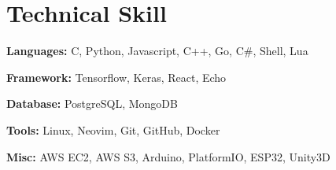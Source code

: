 \section{Technical Skill}
    \begin{onecolentry}
        \textbf{Languages:} C, Python, Javascript, C++, Go, C\#, Shell, Lua
    \end{onecolentry}

    \vspace{0.2 cm}

    \begin{onecolentry}
        \textbf{Framework:} Tensorflow, Keras, React, Echo
    \end{onecolentry}

    \vspace{0.2 cm}

    \begin{onecolentry}
        \textbf{Database:} PostgreSQL, MongoDB
    \end{onecolentry}

    \vspace{0.2 cm}

    \begin{onecolentry}
        \textbf{Tools:} Linux, Neovim, Git, GitHub, Docker
    \end{onecolentry}

    \vspace{0.2 cm}

    \begin{onecolentry}
        \textbf{Misc:} AWS EC2, AWS S3, Arduino, PlatformIO, ESP32, Unity3D
    \end{onecolentry}
